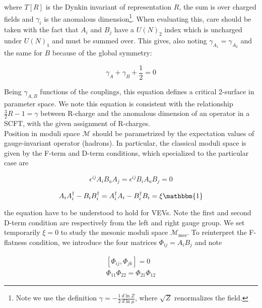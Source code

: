 where $T[R]$ is the Dynkin invariant of representation $R$, the sum is over charged fields and $\gamma_i$ is the anomalous dimension\footnote{Note we use the definition $\gamma = -\frac{1}{2}\frac{d\ln Z}{d \ln \mu}$, where $\sqrt Z$ renormalizes the field.}. When evaluating this, care should be taken with the fact that $A_i$ and $B_j$ have a $U(N)_2$ index which is uncharged under $U(N)_1$ and must be summed over. This gives, also noting $\gamma_{A_1} = \gamma_{A_2}$ and the same for $B$ because of the global symmetry:

\begin{equation}
	\gamma_A + \gamma_B + \frac{1}{2} = 0
	\label{}
\end{equation}

Being $\gamma_{A,B}$ functions of the couplings, this equation defines a critical 2-surface in parameter space. We note this equation is consistent with the relationship $\frac{3}{2}R-1 = \gamma$ between R-charge and the anomalous dimension of an operator in a SCFT, with the given assignment of R-charges.\\

Position in moduli space $\mathcal{M}$ should be parametrized by the expectation values of gauge-invariant operator (hadrons). In particular, the classical moduli space is given by the F-term and D-term conditions, which specialized to the particular case are

\begin{equation}
	\epsilon^{ij} A_i B_a A_j = \epsilon^{ij} B_i A_a B_j = 0
	\label{}
\end{equation}

\begin{equation}
	A_i A_i^\dagger - B_i B_i^\dagger = A^\dagger_i A_i - B^\dagger_i B_i = \xi \mathbbm{1}
	\label{}
\end{equation}

the equation have to be understood to hold for VEVs. Note the first and second D-term condition are respectively from the left and right gauge group. We set temporarily $\xi = 0$ to study the mesonic moduli space $\mathcal{M}_\text{mes}$. To reinterpret the F-flatness condition, we introduce the four matrices $\Phi_{ij} = A_i B_j$ and note

\begin{align}
	\left[ \Phi_{ij} , \Phi_{jk} \right] = 0\\
	\Phi_{11} \Phi_{22} = \Phi_{21}\Phi_{12}
	\label{}
\end{align}

